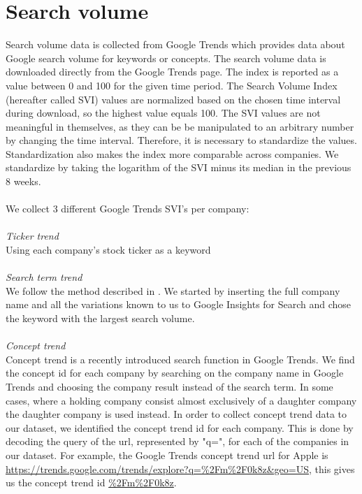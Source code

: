 \section{Search volume}\label{sec:search volume}
Search volume data is collected from Google Trends which provides data about Google search volume for keywords or concepts. The search volume data is downloaded directly from the Google Trends page. The index is reported as a value between 0 and 100 for the given time period. The Search Volume Index (hereafter called SVI) values are normalized based on the chosen time interval during download, so the highest value equals 100. The SVI values are not meaningful in themselves, as they can be be manipulated to an arbitrary number by changing the time interval. Therefore, it is necessary to standardize the values. Standardization also makes the index more comparable across companies. We standardize by taking the logarithm of the SVI minus its median in the previous 8 weeks. 
\\\\
We collect 3 different Google Trends SVI's per company:
\\\\
\textit{Ticker trend}
\\
Using each company's stock ticker as a keyword
\\\\
\textit{Search term trend}
\\
We follow the method described in  \cite{vlastakis}. We started by inserting the full company name and all the variations known to us to Google Insights for Search and chose the keyword with the largest search volume.
\\\\
\textit{Concept trend}
\\
Concept trend is a recently introduced search function in Google Trends. We find the concept id for each company by searching on the company name in Google Trends and choosing the company result instead of the search term. In some cases, where a holding company consist almost exclusively of a daughter company the daughter company is used instead. In order to collect concept trend data to our dataset, we identified the concept trend id for each company. This is done by decoding the query of the url, represented by "q=", for each of the companies in our dataset. For example, the Google Trends concept trend url for Apple is \url{https://trends.google.com/trends/explore?q=%2Fm%2F0k8z&geo=US}, this gives us the concept trend id \url{%2Fm%2F0k8z}.
